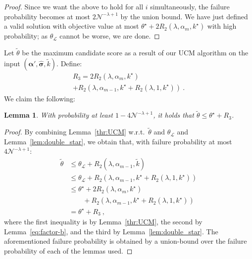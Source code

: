 \documentclass[letterpaper]{article} %
\newtheorem{lemma}[theorem]{Lemma}
\theoremstyle{definition}
\newcommand{\NN}{\mathcal{N}}
\newcommand{\LL}{\mathcal{L}}
\newcommand\vecgreek{\bm}
\newcommand{\veca}{\vecgreek{\alpha}}
\begin{document}
\begin{proof}
	Since we want the above to hold for all $i$ simultaneously, the failure probability becomes at most $2\NN^{-\lambda+1}$ by the union bound.
	We have just defined a valid solution with objective value at most $\theta^\star  +   2R_2(\lambda, \alpha_{m},k^\star)$ with high probability; as $\theta_{\LL}$ cannot be worse, we are done.
\end{proof}


Let $\tilde{\theta}$ be the maximum candidate score as a result of our UCM algorithm on the input $(\veca', \hat{\vecgreek{\sigma}}, \tilde{k})$. Define:
\begin{multline*}
	R_3=2R_2(\lambda, \alpha_{m},k^\star ) \\
	+R_2(\lambda, \alpha_{m-1},k^\star + R_2(\lambda, 1,k^\star))\ .
\end{multline*}
We claim the following:
\begin{lemma}\label{lem:tt}
	With probability at least $1-4\NN^{-\lambda + 1}$, it holds that $\tilde{\theta} \leq \theta^\star  + 	R_3$.
\end{lemma}

\begin{proof}
	By combining Lemma~\ref{thr:UCM} w.r.t.\ $\tilde{\theta}$ and $\theta_{\LL}$ and Lemma~\ref{lem:double_star}, we obtain that, with failure probability at most $4\NN^{-\lambda + 1}$:
	\begin{align*}
	\tilde{\theta} &\leq \theta_{\LL} + R_2(\lambda, \alpha_{m-1},\tilde{k})\\
	&\leq \theta_{\LL} + R_2(\lambda, \alpha_{m-1},k^\star + R_2(\lambda, 1,k^\star))\\
	&\leq  \theta^\star  + 2R_2(\lambda, \alpha_{m},k^\star )\\
	&\qquad +R_2(\lambda, \alpha_{m-1},k^\star + R_2(\lambda, 1,k^\star))\\
	&= \theta^\star  + 	R_3\ ,
	\end{align*}
	where the first inequality is by Lemma~\ref{thr:UCM}, the second by Lemma~\ref{eq:factor-b},
and the third by
	Lemma~\ref{lem:double_star}. The aforementioned failure probability is obtained by a union-bound over the failure probability of each of the lemmas used.
\end{proof}
\end{document}
